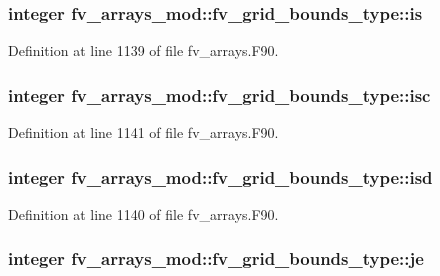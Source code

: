\subsubsection[{is}]{\setlength{\rightskip}{0pt plus 5cm}integer fv\-\_\-arrays\-\_\-mod\-::fv\-\_\-grid\-\_\-bounds\-\_\-type\-::is}\label{structfv__arrays__mod_1_1fv__grid__bounds__type_a84222fa7344fd5b1e3af3a1c1511edbe}


Definition at line 1139 of file fv\-\_\-arrays.\-F90.

\subsubsection[{isc}]{\setlength{\rightskip}{0pt plus 5cm}integer fv\-\_\-arrays\-\_\-mod\-::fv\-\_\-grid\-\_\-bounds\-\_\-type\-::isc}\label{structfv__arrays__mod_1_1fv__grid__bounds__type_a27c3ae729a8702577e90f5db757aeaf9}


Definition at line 1141 of file fv\-\_\-arrays.\-F90.

\subsubsection[{isd}]{\setlength{\rightskip}{0pt plus 5cm}integer fv\-\_\-arrays\-\_\-mod\-::fv\-\_\-grid\-\_\-bounds\-\_\-type\-::isd}\label{structfv__arrays__mod_1_1fv__grid__bounds__type_a093e99292611def96f8c93bded235b1e}


Definition at line 1140 of file fv\-\_\-arrays.\-F90.

\subsubsection[{je}]{\setlength{\rightskip}{0pt plus 5cm}integer fv\-\_\-arrays\-\_\-mod\-::fv\-\_\-grid\-\_\-bounds\-\_\-type\-::je}\label{structfv__arrays__mod_1_1fv__grid__bounds__type_a6c45e731bc1722c4c3f8754603be8b14}


